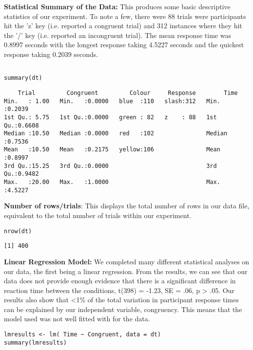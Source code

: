 \documentclass{article}
\begin{document}
\vspace{2em} \textbf{Statistical Summary of the Data:} This produces some basic descriptive statistics of our experiment. To note a few, there were 88 trials were participants hit the 'z' key (i.e. reported a congruent trial) and 312 instances where they hit the '/' key (i.e. reported an incongruent trial). The mean response time was 0.8997 seconds with the longest response taking 4.5227 seconds and the quickest response taking 0.2039 seconds. 
\begin{verbatim}

summary(dt)

\end{verbatim}

\begin{verbatim}
    Trial         Congruent         Colour     Response        Time       
Min.   : 1.00   Min.   :0.0000   blue  :110   slash:312   Min.   :0.2039  
1st Qu.: 5.75   1st Qu.:0.0000   green : 82   z    : 88   1st Qu.:0.6608  
Median :10.50   Median :0.0000   red   :102               Median :0.7536  
Mean   :10.50   Mean   :0.2175   yellow:106               Mean   :0.8997  
3rd Qu.:15.25   3rd Qu.:0.0000                            3rd Qu.:0.9482  
Max.   :20.00   Max.   :1.0000                            Max.   :4.5227
\end{verbatim}

\textbf{Number of rows/trials}: This displays the total number of rows in our data file, equivalent to the total number of trials within our experiment.
\begin{verbatim}
nrow(dt)
\end{verbatim}

\begin{verbatim}
[1] 400
\end{verbatim}


\vspace{2em} \textbf{Linear Regression Model:} We completed many different statistical analyses on our data, the first being a linear regression. From the results, we can see that our data does not provide enough evidence that there is a significant difference in reaction time between the conditions, t(398) = -1.23, SE = .06, p > .05. Our results also show that <1\% of the total variation in participant response times can be explained by our independent variable, congruency. This means that the model used was not well fitted with for the data.
\begin{verbatim}
lmresults <- lm( Time ~ Congruent, data = dt)
summary(lmresults)
\end{verbatim}
\end{document}
